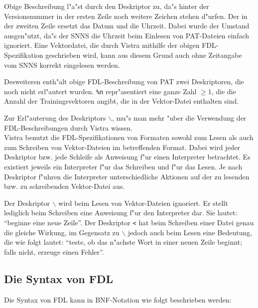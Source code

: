 Obige Beschreibung l"a"st durch den Deskriptor {\tt *} zu, da"s hinter
der Versionsnummer in der ersten Zeile noch weitere Zeichen stehen d"urfen.
Der {\tt *} in der zweiten Zeile ersetzt das Datum und die Uhrzeit.
Dabei wurde der Umstand ausgen"utzt, da"s der SNNS die Uhrzeit 
beim Einlesen von PAT-Dateien einfach ignoriert.
Eine Vektordatei, die durch Vistra mithilfe der obigen FDL-Spezifikation
geschrieben wird, kann aus diesem Grund auch ohne Zeitangabe vom SNNS
korrekt eingelesen werden.  

Desweiteren enth"alt obige FDL-Beschreibung von PAT zwei Deskriptoren, die
noch nicht erl"autert wurden.
{\tt \%n} repr"asentiert eine ganze Zahl $\geq 1$, die die Anzahl der 
Trainingsvektoren angibt, die in der Vektor-Datei enthalten sind.

Zur Erl"auterung des Deskriptors {\tt $\backslash$}, 
mu"s man mehr
"uber die Verwendung der FDL-Be\-schreib\-ungen durch Vistra wissen. \\
Vistra benutzt die FDL-Spezifikationen von Formaten sowohl zum Lesen
als auch zum Schreiben von Vektor-Dateien im betreffenden Format.
Dabei wird jeder Deskriptor bzw. jede Schleife als Anweisung f"ur
einen Interpreter betrachtet.
Es existiert jeweils ein Interpreter f"ur das Schreiben und f"ur das Lesen.
Je nach Deskriptor f"uhren die Interpreter unterschiedliche Aktionen 
auf der zu lesenden bzw. zu schreibenden Vektor-Datei aus.

Der Deskriptor {\tt $\backslash$} wird beim Lesen von Vektor-Dateien ignoriert.
Er stellt lediglich beim Schreiben eine Anweisung f"ur den Interpreter
dar.
Sie lautet: "`beginne eine neue Zeile"'.
Der Deskriptor {\tt <} hat beim Schreiben einer Datei genau die gleiche
Wirkung, im Gegensatz zu {\tt $\backslash$} jedoch auch beim Lesen 
eine Bedeutung, 
die wie folgt lautet: "`teste, ob das n"achste Wort in einer neuen Zeile
beginnt; falls nicht, erzeuge einen Fehler"'.

\subsection{Die Syntax von FDL}

Die Syntax von FDL kann in BNF-Notation wie folgt beschrieben werden:

